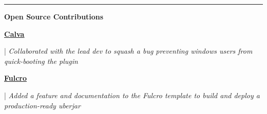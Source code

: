 \documentclass[letterpaper,11pt]{article}
\begin{document}
\noindent\rule{19.5cm}{0.4pt}

\textbf{\large \textcolor{magic_blue}{Open Source Contributions}}


\begin{minipage}[t]{0.08\textwidth}
    \raggedright
    \href{https://github.com/BetterThanTomorrow/calva/issues/2325}{ \underline{\textbf{Calva}}} \\
  \end{minipage}
  \hfill
  \begin{minipage}[t]{0.90\textwidth}
    \raggedright
    |\textit{ Collaborated with the lead dev to squash a bug preventing windows users from quick-booting the plugin } \\
  \end{minipage}
  
  \begin{minipage}[t]{0.08\textwidth}
    \raggedright
    \href{https://github.com/fulcrologic/fulcro-template/pull/28}{ \underline{\textbf{Fulcro}}} \\
  \end{minipage}
  \hfill
  \begin{minipage}[t]{0.90\textwidth}
    \raggedright
    |\textit{ Added a feature and documentation to the Fulcro template to build and deploy a production-ready uberjar } \\
  \end{minipage}
  
\end{document}

